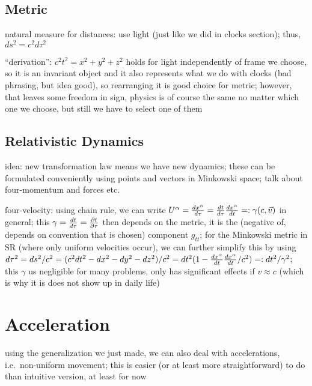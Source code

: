 		\subsection{Metric}
natural measure for distances: use light (just like we did in clocks section); thus, $ds^2 = c^2 d\tau^2$

\enquote{derivation}: $c^2 t^2 = x^2 + y^2 + z^2$ holds for light independently of frame we choose, so it is an invariant object and it also represents what we do with clocks (bad phrasing, but idea good), so rearranging it is good choice for metric; however, that leaves some freedom in sign, physics is of course the same no matter which one we choose, but still we have to select one of them



		\subsection{Relativistic Dynamics}
idea: new transformation law means we have new dynamics; these can be formulated conveniently using points and vectors in Minkowski space; talk about four-momentum and forces etc.


four-velocity: using chain rule, we can write $U^\alpha = \dv{x^\alpha}{\tau} = \dv{t}{\tau} \dv{x^\alpha}{t} =: \gamma (c, \vec{v})$ in general; this $\gamma = \dv{t}{\tau} = \pdv{t}{\tau}$ then depends on the metric, it is the (negative of, depends on convention that is chosen) component $g_{tt}$; for the Minkowski metric in SR (where only uniform velocities occur), we can further simplify this by using $d\tau^2 = ds^2 / c^2 = (c^2 dt^2 - dx^2 - dy^2 - dz^2) / c^2 = dt^2 (1 - \dv{x^\alpha}{t} \dv{x^\alpha}{t} / c^2) =: dt^2 / \gamma^2$; this $\gamma$ us negligible for many problems, only has significant effects if $v \approx c$ (which is why it is does not show up in daily life)



\newpage



	\section{Acceleration}%
using the generalization we just made, we can also deal with accelerations, i.e.~non-uniform movement; this is easier (or at least more straightforward) to do than intuitive version, at least for now


